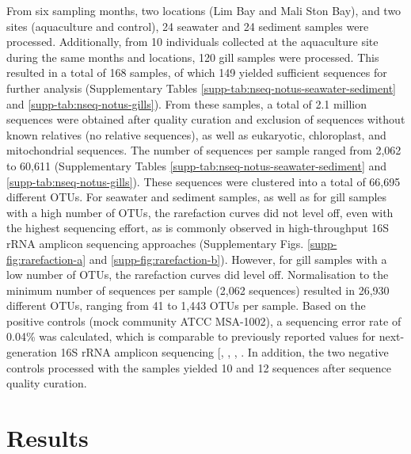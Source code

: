 \documentclass[
  12 pt,
]{article}
\begin{document}
From six sampling months, two locations (Lim Bay and Mali Ston Bay), and two sites (aquaculture and control), 24 seawater and 24 sediment samples were processed. Additionally, from 10 individuals collected at the aquaculture site during the same months and locations, 120 gill samples were processed. This resulted in a total of 168 samples, of which 149 yielded sufficient sequences for further analysis (Supplementary Tables \ref{supp-tab:nseq-notus-seawater-sediment} and \ref{supp-tab:nseq-notus-gills}). From these samples, a total of 2.1 million sequences were obtained after quality curation and exclusion of sequences without known relatives (no relative sequences), as well as eukaryotic, chloroplast, and mitochondrial sequences. The number of sequences per sample ranged from 2,062 to 60,611 (Supplementary Tables \ref{supp-tab:nseq-notus-seawater-sediment} and \ref{supp-tab:nseq-notus-gills}). These sequences were clustered into a total of 66,695 different OTUs. For seawater and sediment samples, as well as for gill samples with a high number of OTUs, the rarefaction curves did not level off, even with the highest sequencing effort, as is commonly observed in high-throughput 16S rRNA amplicon sequencing approaches (Supplementary Figs. \ref{supp-fig:rarefaction-a} and \ref{supp-fig:rarefaction-b}). However, for gill samples with a low number of OTUs, the rarefaction curves did level off. Normalisation to the minimum number of sequences per sample (2,062 sequences) resulted in 26,930 different OTUs, ranging from 41 to 1,443 OTUs per sample. Based on the positive controls (mock community ATCC MSA-1002), a sequencing error rate of 0.04\unit{\percent} was calculated, which is comparable to previously reported values for next-generation 16S rRNA amplicon sequencing {[}, , , \citeproc{ref-Schloss2016}{88}{]}. In addition, the two negative controls processed with the samples yielded 10 and 12 sequences after sequence quality curation.
\newpage

\section{Results}\label{results}
\end{document}
